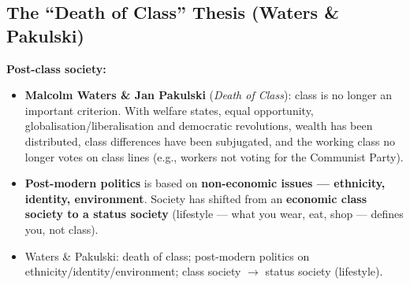 \sectiondivider

\subsection{The ``Death of Class'' Thesis (Waters \& Pakulski)}

\begin{KeyConcept}
\textbf{Post-class society:}
\begin{itemize}
\item \textbf{Malcolm Waters \& Jan Pakulski} (\textit{Death of Class}): class is no longer an important criterion. With welfare states, equal opportunity, globalisation/liberalisation and democratic revolutions, wealth has been distributed, class differences have been subjugated, and the working class no longer votes on class lines (e.g., workers not voting for the Communist Party).
\item \textbf{Post-modern politics} is based on \textbf{non-economic issues --- ethnicity, identity, environment}. Society has shifted from an \textbf{economic class society to a status society} (lifestyle --- what you wear, eat, shop --- defines you, not class).
\end{itemize}
\end{KeyConcept}

\begin{QuickRevision}
\begin{itemize}
\item Waters \& Pakulski: death of class; post-modern politics on ethnicity/identity/environment; class society $\rightarrow$ status society (lifestyle).
\end{itemize}
\end{QuickRevision}

